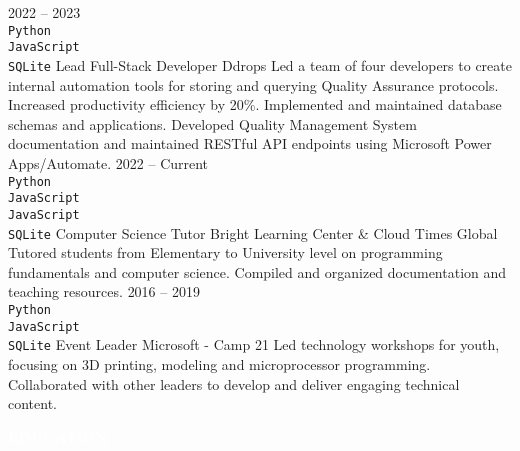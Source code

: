 \documentclass[9pt]{src/developercv} %
\begin{document}
\begin{entrylist}
	\entry
		{2022 -- 2023\\
		\footnotesize{\texttt{Python}}\hfill\\
		\footnotesize{\texttt{JavaScript}}\hfill\\
		\footnotesize{\texttt{SQLite}}\hfill}
		{Lead Full-Stack Developer}
		{Ddrops}
		{Led a team of four developers to create internal automation tools for storing and querying Quality Assurance protocols. Increased productivity efficiency by 20\%. Implemented and maintained database schemas and applications. Developed Quality Management System documentation and maintained RESTful API endpoints using Microsoft Power Apps/Automate.}
	\entry
		{2022 -- Current\\
		\footnotesize{\texttt{Python}}\hfill\\
		\footnotesize{\texttt{JavaScript}}\hfill\\
		\footnotesize{\texttt{JavaScript}}\hfill\\
		\footnotesize{\texttt{SQLite}}\hfill}
		{Computer Science Tutor}
		{Bright Learning Center \& Cloud Times Global}
		{Tutored students from Elementary to University level on programming fundamentals and computer science. Compiled and organized documentation and teaching resources.}
	\entry
		{2016 -- 2019\\		\footnotesize{\texttt{Python}}\hfill\\
		\footnotesize{\texttt{JavaScript}}\hfill\\
		\footnotesize{\texttt{SQLite}}\hfill}
		{Event Leader}
		{Microsoft - Camp 21}
		{Led technology workshops for youth, focusing on 3D printing, modeling and microprocessor programming. Collaborated with other leaders to develop and deliver engaging technical content.}
\end{entrylist}


\vspace{\baselineskip} %
\colorbox{cyan800}{\textcolor{white}{\MakeUppercase{\textbf{Education}}}}\\%
\end{document}
